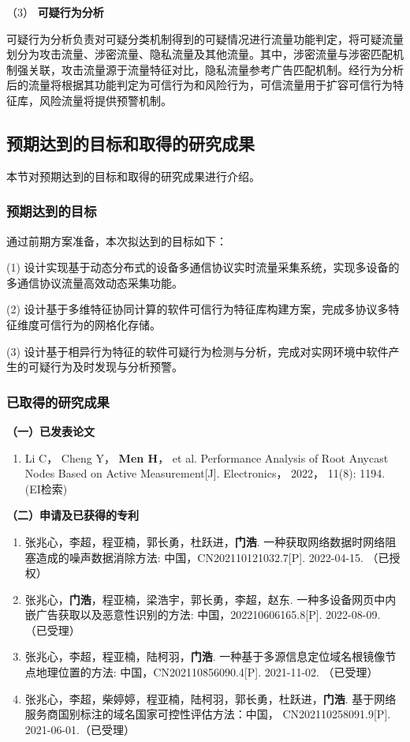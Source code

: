 （3） \textbf{可疑行为分析}\quad

可疑行为分析负责对可疑分类机制得到的可疑情况进行流量功能判定，将可疑流量划分为攻击流量、涉密流量、隐私流量及其他流量。其中，涉密流量与涉密匹配机制强关联，攻击流量源于流量特征对比，隐私流量参考广告匹配机制。经行为分析后的流量将根据其功能判定为可信行为和风险行为，可信流量用于扩容可信行为特征库，风险流量将提供预警机制。

\subsection{预期达到的目标和取得的研究成果}
本节对预期达到的目标和取得的研究成果进行介绍。
\subsubsection{预期达到的目标}

通过前期方案准备，本次拟达到的目标如下：

(1) 设计实现基于动态分布式的设备多通信协议实时流量采集系统，实现多设备的多通信协议流量高效动态采集功能。

(2) 设计基于多维特征协同计算的软件可信行为特征库构建方案，完成多协议多特征维度可信行为的网格化存储。

(3) 设计基于相异行为特征的软件可疑行为检测与分析，完成对实网环境中软件产生的可疑行为及时发现与分析预警。

\subsubsection{已取得的研究成果}

	\noindent\textbf{（一）已发表论文}
	\begin{enumerate}
	\item Li C， Cheng Y， \textbf{Men H}， et al. Performance Analysis of Root Anycast Nodes Based on Active Measurement[J]. Electronics， 2022， 11(8): 1194. \quad (EI检索)
\end{enumerate}
\noindent\textbf{（二）申请及已获得的专利}
\begin{enumerate}
\item 张兆心，李超，程亚楠，郭长勇，杜跃进，\textbf{门浩}. 一种获取网络数据时网络阻塞造成的噪声数据消除方法: 中国，CN202110121032.7[P]. 2022-04-15. （已授权）
\item 张兆心，\textbf{门浩}，程亚楠，梁浩宇，郭长勇，李超，赵东. 一种多设备网页中内嵌广告获取以及恶意性识别的方法: 中国，202210606165.8[P]. 2022-08-09. （已受理）
\item 张兆心，李超，程亚楠，陆柯羽，\textbf{门浩}. 一种基于多源信息定位域名根镜像节点地理位置的方法: 中国，CN202110856090.4[P]. 2021-11-02. （已受理）
\item 张兆心，李超，柴婷婷，程亚楠，陆柯羽，郭长勇，杜跃进，\textbf{门浩}. 基于网络服务商国别标注的域名国家可控性评估方法：中国， CN202110258091.9[P]. 2021-06-01.（已受理）
\end{enumerate}

